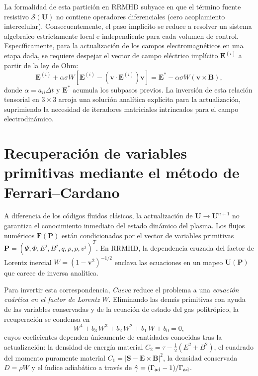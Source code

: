 \primerparrafo La formalidad de esta partición en RRMHD subyace en que el término fuente resistivo $\mathcal{S}(\mathbf{U})$ no contiene operadores diferenciales (cero acoplamiento intercelular). Consecuentemente, el paso implícito se reduce a resolver un sistema algebraico estrictamente local e independiente para cada volumen de control. Específicamente, para la actualización de los campos electromagnéticos en una etapa dada, se requiere despejar el vector de campo eléctrico implícito $\mathbf{E}^{(i)}$ a partir de la ley de Ohm:
\begin{equation}
    \mathbf{E}^{(i)} + \alpha \sigma W \left[ \mathbf{E}^{(i)} - (\mathbf{v} \cdot \mathbf{E}^{(i)}) \mathbf{v} \right] = \mathbf{E}^* - \alpha \sigma W (\mathbf{v} \times \mathbf{B}),
\end{equation}
donde $\alpha = a_{ii} \Delta t$ y $\mathbf{E}^*$ acumula los subpasos previos. La inversión de esta relación tensorial en $3 \times 3$ arroja una solución analítica explícita para la actualización, suprimiendo la necesidad de iteradores matriciales intrincados para el campo electrodinámico.

\section[Recuperación de Variables Primitivas]{Recuperación de variables primitivas mediante el método de Ferrari--Cardano}
\label{sec:Recuperacion_Primitivas}

\primerparrafo A diferencia de los códigos fluidos clásicos, la actualización de $\mathbf{U} \to \mathbf{U}^{n+1}$ no garantiza el conocimiento inmediato del estado dinámico del plasma. Los flujos numéricos $\mathbf{F}(\mathbf{P})$ están condicionados por el vector de variables primitivas $\mathbf{P} = (\Psi, \Phi, E^j, B^j, q, \rho, p, v^j)^T$. En RRMHD, la dependencia cruzada del factor de Lorentz inercial $W = (1 - \mathbf{v}^2)^{-1/2}$ enclava las ecuaciones en un mapeo $\mathbf{U}(\mathbf{P})$ que carece de inversa analítica.

Para invertir esta correspondencia, \textit{Cueva} reduce el problema a una \emph{ecuación cuártica en el factor de Lorentz} $W$. Eliminando las demás primitivas con ayuda de las variables conservadas y de la ecuación de estado del gas politrópico, la recuperación se condensa en
\begin{equation}
    W^4 + b_3\,W^3 + b_2\,W^2 + b_1\,W + b_0 = 0,
\end{equation}
cuyos coeficientes dependen únicamente de cantidades conocidas tras la actualización: la densidad de energía material $C_2 = \tau - \tfrac{1}{2}(E^2+B^2)$, el cuadrado del momento puramente material $C_1 = |\mathbf{S} - \mathbf{E}\times\mathbf{B}|^2$, la densidad conservada $D = \rho W$ y el índice adiabático a través de $\hat{\gamma} = (\Gamma_{\rm ad}-1)/\Gamma_{\rm ad}$.

